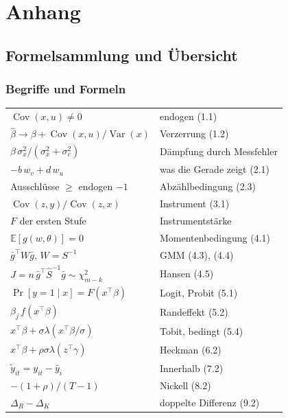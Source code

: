 \appendix
\part{Anhang}

\newcommand{\lit}[3]{\vspace{5pt}\noindent\textbf{[#1]} #2\par\nopagebreak\vspace{1pt}{\small\itshape\color{grau} #3}\par\vspace{2pt}}

\chapter{Formelsammlung und Übersicht}

\section{Begriffe und Formeln}

\begin{merksatz}
\begin{center}
{\small
\renewcommand{\arraystretch}{1.6}
\begin{tabular}{@{}P{4.4cm}P{4.2cm}@{}}
\toprule
$\operatorname{Cov}(x,u) \ne 0$ & endogen (1.1)\\
$\hat\beta \to \beta + \operatorname{Cov}(x,u)/\operatorname{Var}(x)$ & Verzerrung (1.2)\\
$\beta\,\sigma_x^{2}/(\sigma_x^{2}+\sigma_e^{2})$ & Dämpfung durch Messfehler\\
$-b\,w_v + d\,w_u$ & was die Gerade zeigt (2.1)\\
Ausschlüsse $\ge$ endogen $-1$ & Abzählbedingung (2.3)\\
$\operatorname{Cov}(z,y)/\operatorname{Cov}(z,x)$ & Instrument (3.1)\\
$F$ der ersten Stufe & Instrumentstärke\\
$\mathbb{E}[g(w,\theta)] = 0$ & Momentenbedingung (4.1)\\
$\bar g^{\top}W\bar g$, $W = S^{-1}$ & GMM (4.3), (4.4)\\
$J = n\,\bar g^{\top}\hat S^{-1}\bar g \sim \chi^{2}_{m-k}$ & Hansen (4.5)\\
$\Pr[y=1\mid x] = F(x^{\top}\beta)$ & Logit, Probit (5.1)\\
$\beta_j\,f(x^{\top}\beta)$ & Randeffekt (5.2)\\
$x^{\top}\beta + \sigma\lambda(x^{\top}\beta/\sigma)$ & Tobit, bedingt (5.4)\\
$x^{\top}\beta + \rho\sigma\lambda(z^{\top}\gamma)$ & Heckman (6.2)\\
$\tilde y_{it} = y_{it}-\bar y_i$ & Innerhalb (7.2)\\
$-(1+\rho)/(T-1)$ & Nickell (8.2)\\
$\Delta_R - \Delta_K$ & doppelte Differenz (9.2)\\
\bottomrule
\end{tabular}}
\end{center}
\end{merksatz}

